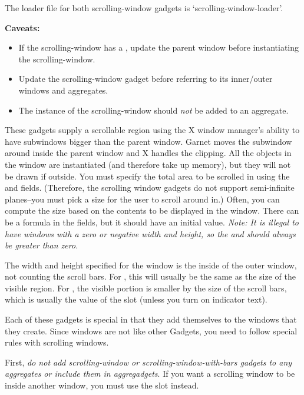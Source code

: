 The loader file for both scrolling-window gadgets is
`scrolling-window-loader'.

{\bf Caveats:
\begin{itemize}
\item If the scrolling-window has a , update the parent
window before instantiating the scrolling-window.

\item Update the scrolling-window gadget before referring to its inner/outer
windows and aggregates.

\item The instance of the scrolling-window should {\it not} be added to an aggregate.
\end{itemize}}

These gadgets supply a scrollable region using the X window manager's
ability to have subwindows bigger than the parent window.  Garnet
moves the subwindow around inside the parent window and X handles the
clipping.  All the objects in the window are instantiated (and
therefore take up memory), but they will not be drawn if outside.  You
must specify the total area to be scrolled in using the
 and  fields.  (Therefore, the
scrolling window gadgets do not support semi-infinite planes--you must
pick a size for the user to scroll around in.)  Often, you can compute
the size based on the contents to be displayed in the window.  There
can be a formula in the  fields, but it should have an
initial value.  {\it Note: It is illegal to have windows with a zero or
negative width and height, so the
 and  should always be greater than
zero.}

The width and height specified for the window is the inside of the
outer window, not counting the scroll bars.  For
, this will usually be the same as the size of
the visible region.  For , the visible
portion is smaller by the size of the scroll bars, which is usually
the value of the  slot (unless you turn on
indicator text).

Each of these gadgets is special in that they add themselves to the
windows that they create.  Since windows are not like other Gadgets,
you need to follow special rules with scrolling windows.

First, {\it do not add scrolling-window or scrolling-window-with-bars
gadgets to any aggregates or include them in aggregadgets}.  If you
want a scrolling window to be inside another window, you must use the
 slot instead.

